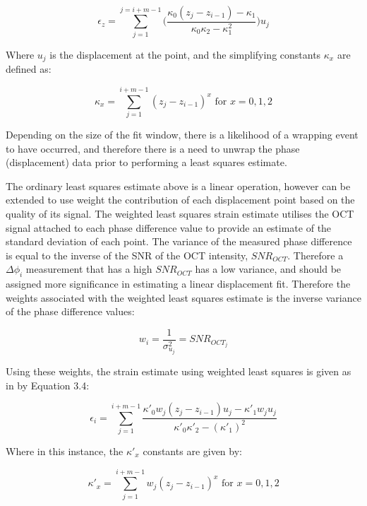 \begin{equation}
	\epsilon_z = \sum\limits_{j=1}^{j=i+m-1} \bigg(\frac{\kappa_0 (z_j-z_{i-1})-\kappa_1}{\kappa_0 \kappa_2 - \kappa_1^2} \bigg) u_j
\end{equation}

Where $u_j$ is the displacement at the point, and the simplifying constants $\kappa_x$ are defined as:

\begin{equation}
\kappa_x = \sum \limits_{j=1}^{i+m-1} (z_j - z_{i-1})^x \text{   for   } x = 0,1,2
\end{equation}

Depending on the size of the fit window, there is a likelihood of a wrapping event to have occurred, and therefore there is a need to unwrap the phase (displacement) data prior to performing a least squares estimate. 

The ordinary least squares estimate above is a linear operation, however can be extended to use weight the contribution of each displacement point based on the quality of its signal. The weighted least squares strain estimate utilises the OCT signal attached to each phase difference value to provide an estimate of the standard deviation of each point. The variance of the measured phase difference is equal to the inverse of the SNR of the OCT intensity, $SNR_{OCT}$. Therefore a $\Delta \phi_i$ measurement that has a high $SNR_{OCT}$ has a low variance, and should be assigned more significance in estimating a linear displacement fit. Therefore the weights associated with the weighted least squares estimate is the inverse variance of the phase difference values:

\begin{equation}
w_i = \frac{1}{\sigma_{u_j}^2} = SNR_{OCT_j}
\end{equation}

Using these weights, the strain estimate using weighted least squares is given as in \cite{kennedy_strain_2012} by Equation 3.4:

\begin{equation}
\epsilon_i = \sum \limits_{j=1}^{i+m-1} \frac{\kappa'_0 w_j (z_j - z_{i-1}) u_j - \kappa'_1 w_j u_j}{\kappa'_0 \kappa'_2 - (\kappa'_1)^2}
\end{equation}

Where in this instance, the $\kappa'_x$ constants are given by:

\begin{equation}
\kappa'_x = \sum \limits_{j=1}^{i+m-1} w_j (z_j - z_{i-1})^x \text{   for   } x=0,1,2
\end{equation}

